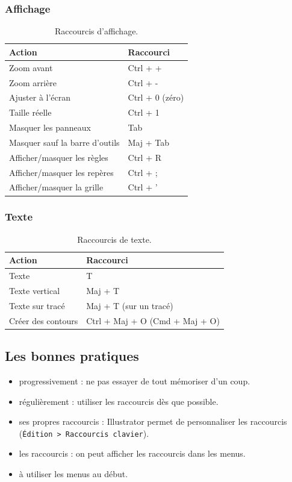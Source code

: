 \subsubsection{Affichage}

\begin{table}[h!]
\centering
\begin{tabular}{@{}ll@{}}
\toprule
\textbf{Action} & \textbf{Raccourci} \\
\midrule
Zoom avant & Ctrl + + \\
Zoom arrière & Ctrl + - \\
Ajuster à l'écran & Ctrl + 0 (zéro) \\
Taille réelle & Ctrl + 1 \\
Masquer les panneaux & Tab \\
Masquer sauf la barre d'outils & Maj + Tab \\
Afficher/masquer les règles & Ctrl + R \\
Afficher/masquer les repères & Ctrl + ; \\
Afficher/masquer la grille & Ctrl + ' \\
\bottomrule
\end{tabular}
\caption{Raccourcis d'affichage.}
\end{table}

\subsubsection{Texte}

\begin{table}[h!]
\centering
\begin{tabular}{@{}ll@{}}
\toprule
\textbf{Action} & \textbf{Raccourci} \\
\midrule
Texte & T \\
Texte vertical & Maj + T \\
Texte sur tracé & Maj + T (sur un tracé) \\
Créer des contours & Ctrl + Maj + O (Cmd + Maj + O) \\
\bottomrule
\end{tabular}
\caption{Raccourcis de texte.}
\end{table}

\subsection{Les bonnes pratiques}

\begin{itemize}
    \item {} progressivement : ne pas essayer de tout mémoriser d'un coup.
    \item {} régulièrement : utiliser les raccourcis dès que possible.
    \item {} ses propres raccourcis : Illustrator permet de personnaliser les raccourcis (\texttt{Édition > Raccourcis clavier}).
    \item {} les raccourcis : on peut afficher les raccourcis dans les menus.
    \item {} à utiliser les menus au début.
\end{itemize}

